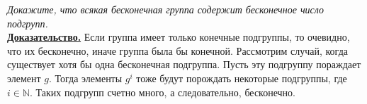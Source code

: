 \documentclass[14pt,a4paper]{scrartcl}
\begin{document}
\begin{spacing}{1}
\begin{center}
\end{center}
\textit{Докажите, что всякая бесконечная группа содержит бесконечное число подгрупп.}\\
\textbf{\underline{Доказательство.}} Если группа имеет только конечные подгруппы, то очевидно, что их бесконечно, иначе группа была бы конечной. Рассмотрим случай, когда существует хотя бы одна бесконечная подгруппа. Пусть эту подгруппу пораждает элемент $g$. Тогда элементы $g^i$ тоже будут порождать некоторые подгруппы, где $i \in \mathbb{N}$. Таких подгрупп счетно много, а следовательно, бесконечно.
\end{spacing}
\end{document}
